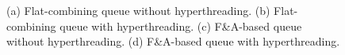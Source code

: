 \begin{figure}[ht!]
\centering
{}

\caption{(a) Flat-combining queue without hyperthreading. (b) Flat-combining queue with hyperthreading. 
(c) F\&A-based queue without hyperthreading. (d) F\&A-based queue with hyperthreading. }
\label{figure:FC_FandA_queues}
\end{figure}